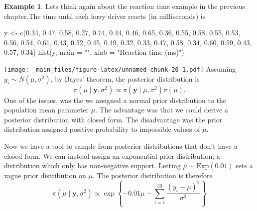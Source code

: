 \documentclass[
]{book}
\newenvironment{Shaded}{\begin{snugshade}}{\end{snugshade}}
\newcommand{\AttributeTok}[1]{\textcolor[rgb]{0.77,0.63,0.00}{#1}}
\newcommand{\FloatTok}[1]{\textcolor[rgb]{0.00,0.00,0.81}{#1}}
\newcommand{\FunctionTok}[1]{\textcolor[rgb]{0.00,0.00,0.00}{#1}}
\newcommand{\NormalTok}[1]{#1}
\newcommand{\OtherTok}[1]{\textcolor[rgb]{0.56,0.35,0.01}{#1}}
\newcommand{\StringTok}[1]{\textcolor[rgb]{0.31,0.60,0.02}{#1}}
\theoremstyle{definition}
\theoremstyle{definition}
\newtheorem{example}{Example}[chapter]
\theoremstyle{definition}
\theoremstyle{definition}
\theoremstyle{remark}
\begin{document}
\begin{example}
\protect\hypertarget{exm:norm}{}\label{exm:norm}Lets think again about the reaction time example in the previous chapter.The time until each lorry driver reacts (in milliseconds) is

\begin{Shaded}
\begin{Highlighting}[]
\NormalTok{y }\OtherTok{\textless{}{-}} \FunctionTok{c}\NormalTok{(}\FloatTok{0.34}\NormalTok{, }\FloatTok{0.47}\NormalTok{, }\FloatTok{0.58}\NormalTok{, }\FloatTok{0.27}\NormalTok{, }\FloatTok{0.74}\NormalTok{, }\FloatTok{0.44}\NormalTok{, }\FloatTok{0.46}\NormalTok{, }\FloatTok{0.65}\NormalTok{, }\FloatTok{0.36}\NormalTok{, }\FloatTok{0.55}\NormalTok{, }\FloatTok{0.58}\NormalTok{, }\FloatTok{0.55}\NormalTok{, }\FloatTok{0.53}\NormalTok{, }\FloatTok{0.56}\NormalTok{, }\FloatTok{0.54}\NormalTok{, }\FloatTok{0.61}\NormalTok{, }\FloatTok{0.43}\NormalTok{, }\FloatTok{0.52}\NormalTok{, }\FloatTok{0.45}\NormalTok{, }\FloatTok{0.49}\NormalTok{, }\FloatTok{0.32}\NormalTok{, }\FloatTok{0.33}\NormalTok{, }\FloatTok{0.47}\NormalTok{, }\FloatTok{0.58}\NormalTok{, }\FloatTok{0.34}\NormalTok{, }\FloatTok{0.60}\NormalTok{, }\FloatTok{0.59}\NormalTok{, }\FloatTok{0.43}\NormalTok{, }\FloatTok{0.57}\NormalTok{, }\FloatTok{0.34}\NormalTok{)}
\FunctionTok{hist}\NormalTok{(y, }\AttributeTok{main =} \StringTok{""}\NormalTok{, }\AttributeTok{xlab =} \StringTok{"Reaction time (ms)"}\NormalTok{)}
\end{Highlighting}
\end{Shaded}

\texttt{[image: \_main\_files/figure-latex/unnamed-chunk-20-1.pdf]}
Assuming \(y_i \sim N(\mu, \sigma^2)\), by Bayes' theorem, the posterior distribution is
\[
\pi(\mu \mid \boldsymbol{y}, \sigma^2) \propto \pi(\boldsymbol{y} \mid \mu, \sigma^2) \pi(\mu).
\]
One of the issues, was the we assigned a normal prior distribution to the population mean parameter \(\mu\). The advantage was that we could derive a posterior distribution with closed form. The disadvantage was the prior distribution assigned positive probability to impossible values of \(\mu\).

Now we have a tool to sample from posterior distributions that don't have a closed form. We can instead assign an exponential prior distribution, a distribution which only has non-negative support. Letting \(\mu \sim \textrm{Exp}(0.01)\) sets a vague prior distribution on \(\mu\). The posterior distribution is therefore
\[
\pi(\mu \mid \boldsymbol{y}, \sigma^2) \propto \exp\left\{-0.01\mu -\sum_{i=1}^{30}\frac{(y_i - \mu)^2}{\sigma^2}\right\} 
\]


\end{example}
\end{document}
